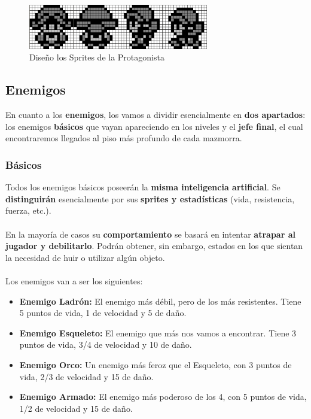 \clearpage

\begin{figure}[h]
\centering
\includegraphics[width=0.7\textwidth]{include/images/gdd/gdd_protagonist.png}
\caption{Diseño los Sprites de la Protagonista}
\label{figure:protagonist_sprites}
\end{figure}

\subsection{Enemigos}

En cuanto a los \textbf{enemigos}, los vamos a dividir esencialmente en \textbf{dos apartados}: los enemigos \textbf{básicos} que vayan apareciendo en los niveles y el \textbf{jefe final}, el cual encontraremos llegados al piso más profundo de cada mazmorra.

\subsubsection{Básicos}

Todos los enemigos básicos poseerán la \textbf{misma inteligencia artificial}. Se \textbf{distinguirán} esencialmente por sus \textbf{sprites y estadísticas} (vida, resistencia, fuerza, etc.).
\\ \\
En la mayoría de casos su \textbf{comportamiento} se basará en intentar \textbf{atrapar al jugador y debilitarlo}. Podrán obtener, sin embargo, estados en los que sientan la necesidad de huir o utilizar algún objeto.
\\ \\
Los enemigos van a ser los siguientes:

\begin{itemize}
	\item \textbf{Enemigo Ladrón:} El enemigo más débil, pero de los más resistentes. Tiene 5 puntos de vida, 1 de velocidad y 5 de daño.
	\item \textbf{Enemigo Esqueleto:} El enemigo que más nos vamos a encontrar. Tiene 3 puntos de vida, 3/4 de velocidad y 10 de daño.
	\item \textbf{Enemigo Orco:} Un enemigo más feroz que el Esqueleto, con 3 puntos de vida, 2/3 de velocidad y 15 de daño.
	\item \textbf{Enemigo Armado:} El enemigo más poderoso de los 4, con 5 puntos de vida, 1/2 de velocidad y 15 de daño.
\end{itemize}

